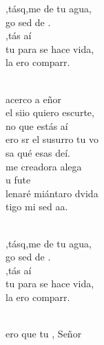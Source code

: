 \documentclass[12pt]{article}
\begin{document}
\begin{multicols*}{2}
\begin{cancion}%
	\begin{chorus}%
	,tásq,me de tu agua, \\
	go sed de .\\
	,tás aí\\
	tu para se hace vida,\\
	la ero comparr.\\
	\end{chorus}%
	\jump\\
	acerco a eñor\\
	el siio quiero escurte,\\
	no que estás aí\\
	ero sr el susurro tu vo\\
	sa qué esas deí.\\
	me creadora  alega \\
	 u fute \\
	lenaré miántaro dvida\\
	tigo mi sed aa. \\\jump\\
	\begin{chorus}%
	,tásq,me de tu agua, \\
	go sed de .\\
	,tás aí\\
	tu para se hace vida,\\
	la ero comparr.\\
	\end{chorus}%
	\jump\\
	ero que tu , Señor\\

\end{cancion}
\end{multicols*}
\end{document}
